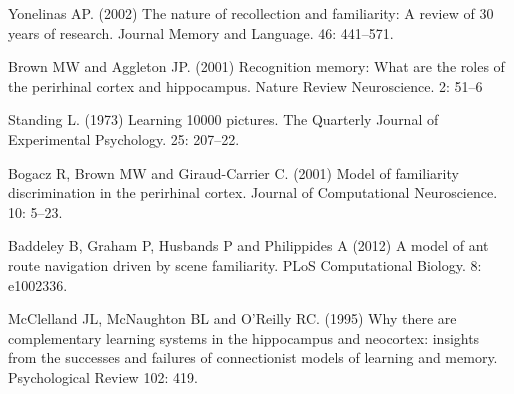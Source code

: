 \documentclass[11pt,a4paper]{scrartcl}
\begin{document}
\begin{thebibliography}{10}

Yonelinas AP. (2002) The nature of recollection and familiarity: A
review of 30 years of research. 
\newblock Journal Memory and Language. 46: 441--571.

Brown MW and Aggleton JP. (2001) Recognition memory: What are the
roles of the perirhinal cortex and hippocampus. 
\newblock Nature Review Neuroscience. 2: 51--6

Standing L. (1973) Learning 10000 pictures.
\newblock  The Quarterly Journal of Experimental Psychology. 25: 207--22.

Bogacz R, Brown MW and Giraud-Carrier C. (2001) Model of familiarity discrimination in the perirhinal cortex.
\newblock Journal of Computational Neuroscience. 10: 5--23.

Baddeley B, Graham P, Husbands P and Philippides A (2012) A model of ant route navigation driven by scene familiarity. 
\newblock PLoS Computational Biology. 8: e1002336.

McClelland JL, McNaughton BL and O'Reilly RC. (1995) Why there are complementary learning systems in the hippocampus and neocortex: insights from the successes and failures of connectionist models of learning and memory.
\newblock Psychological Review 102: 419.

\end{thebibliography}
\end{document}
